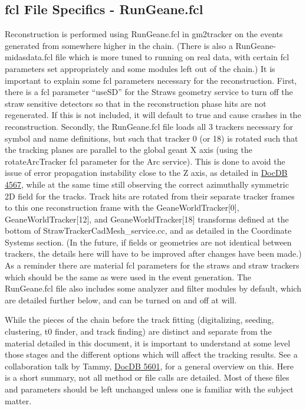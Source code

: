 \documentclass{article}
\begin{document}
  \subsection{fcl File Specifics - RunGeane.fcl} 

    Reconstruction is performed using RunGeane.fcl in gm2tracker on the events generated from somewhere higher in the chain. (There is also a RunGeane-midasdata.fcl file which is more tuned to running on real data, with certain fcl parameters set appropriately and some modules left out of the chain.) It is important to explain some fcl parameters necessary for the reconstruction. First, there is a fcl parameter ``useSD'' for the Straws geometry service to turn off the straw sensitive detectors so that in the reconstruction phase hits are not regenerated. If this is not included, it will default to true and cause crashes in the reconstruction. Secondly, the RunGeane.fcl file loads all 3 trackers necessary for symbol and name definitions, but such that tracker 0 (or 18) is rotated such that the tracking planes are parallel to the global geant X axis (using the rotateArcTracker fcl parameter for the Arc service). This is done to avoid the issue of error propagation instability close to the Z axis, as detailed in \href{http://gm2-docdb.fnal.gov:8080/cgi-bin/ShowDocument?docid=4567}{DocDB 4567}, while at the same time still observing the correct azimuthally symmetric 2D field for the tracks. Track hits are rotated from their separate tracker frames to this one reconstruction frame with the GeaneWorldTracker[0], GeaneWorldTracker[12], and GeaneWorldTracker[18] transforms defined at the bottom of StrawTrackerCadMesh\_service.cc, and as detailed in the Coordinate Systems section. (In the future, if fields or geometries are not identical between trackers, the details here will have to be improved after changes have been made.) As a reminder there are material fcl parameters for the straws and straw trackers which should be the same as were used in the event generation. The RunGeane.fcl file also includes some analyzer and filter modules by default, which are detailed further below, and can be turned on and off at will.

    While the pieces of the chain before the track fitting (digitalizing, seeding, clustering, t0 finder, and track finding) are distinct and separate from the material detailed in this document, it is important to understand at some level those stages and the different options which will affect the tracking results. See a collaboration talk by Tammy, \href{http://gm2-docdb.fnal.gov:8080/cgi-bin/ShowDocument?docid=5601}{DocDB 5601}, for a general overview on this. Here is a short summary, not all method or file calls are detailed. Most of these files and parameters should be left unchanged unless one is familiar with the subject matter.
\end{document}
